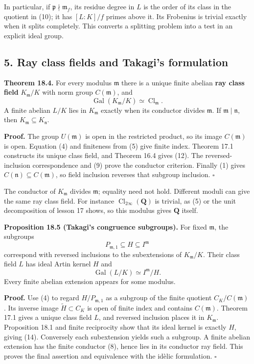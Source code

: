 \documentclass[11pt,a4paper]{article}
\begin{document}
In particular, if \(\mathfrak p\nmid\mathfrak m_f\), its residue degree
in \(L\) is the order of its class in the quotient in (10); it has
\([L:K]/f\) primes above it. Its Frobenius is trivial exactly when it
splits completely. This converts a splitting problem into a test in an
explicit ideal group.

\subsection{5. Ray class fields and Takagi's
formulation}\label{ray-class-fields-and-takagis-formulation}

\textbf{Theorem 18.4.} For every modulus \(\mathfrak m\) there is a
unique finite abelian \textbf{ray class field} \(K_{\mathfrak m}/K\)
with norm group \(C(\mathfrak m)\), and \[
\operatorname{Gal}(K_{\mathfrak m}/K)\simeq\operatorname{Cl}_{\mathfrak m}.
\tag{12}
\] A finite abelian \(L/K\) lies in \(K_{\mathfrak m}\) exactly when its
conductor divides \(\mathfrak m\). If \(\mathfrak m\mid\mathfrak n\),
then \(K_{\mathfrak m}\subseteq K_{\mathfrak n}\).

\textbf{Proof.} The group \(U(\mathfrak m)\) is open in the restricted
product, so its image \(C(\mathfrak m)\) is open. Equation (4) and
finiteness from (5) give finite index. Theorem 17.1 constructs its
unique class field, and Theorem 16.4 gives (12). The reversed-inclusion
correspondence and (9) prove the conductor criterion. Finally (1) gives
\(C(\mathfrak n)\subseteq C(\mathfrak m)\), so field inclusion reverses
that subgroup inclusion. \(\square\)

The conductor of \(K_{\mathfrak m}\) divides \(\mathfrak m\); equality
need not hold. Different moduli can give the same ray class field. For
instance \(\operatorname{Cl}_{2\infty}(\mathbf Q)\) is trivial, as (5)
or the unit decomposition of lesson 17 shows, so this modulus gives
\(\mathbf Q\) itself.

\textbf{Proposition 18.5 (Takagi's congruence subgroups).} For fixed
\(\mathfrak m\), the subgroups \[
P_{\mathfrak m,1}\subseteq H\subseteq I^{\mathfrak m}
\tag{13}
\] correspond with reversed inclusions to the subextensions of
\(K_{\mathfrak m}/K\). Their class field \(L\) has ideal Artin kernel
\(H\) and \[
\operatorname{Gal}(L/K)\simeq I^{\mathfrak m}/H.
\tag{14}
\] Every finite abelian extension appears for some modulus.

\textbf{Proof.} Use (4) to regard \(H/P_{\mathfrak m,1}\) as a subgroup
of the finite quotient \(C_K/C(\mathfrak m)\). Its inverse image
\(\widetilde H\subset C_K\) is open of finite index and contains
\(C(\mathfrak m)\). Theorem 17.1 gives a unique class field \(L\), and
reversed inclusion places it in \(K_{\mathfrak m}\). Proposition 18.1
and finite reciprocity show that its ideal kernel is exactly \(H\),
giving (14). Conversely each subextension yields such a subgroup. A
finite abelian extension has the finite conductor (8), hence lies in its
conductor ray field. This proves the final assertion and equivalence
with the idèlic formulation. \(\square\)
\end{document}
